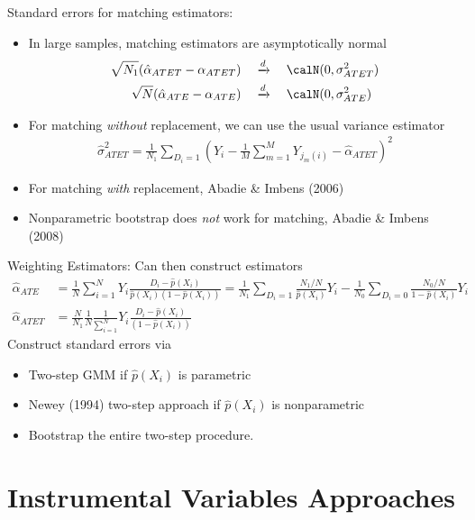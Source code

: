 \documentclass[12pt]{article}
\theoremstyle{plain}
\theoremstyle{definition}
\theoremstyle{remark}
\newcommand{\dto}{\xrightarrow{d}}
\newcommand{\sumiN}{\sum^N_{i=1}}
\begin{document}
\clearpage
Standard errors for matching estimators:
\begin{itemize}
  \item In large samples, matching estimators are asymptotically
    normal
    \begin{align*}
      \sqrt{N_1}(\hat{\alpha}_{ATET}-\alpha_{ATET})
      \quad&\dto\quad
      \calN(0,\sigma^2_{ATET})
      \\
      \sqrt{N}(\hat{\alpha}_{ATE}-\alpha_{ATE})
      \quad&\dto\quad
      \calN(0,\sigma^2_{ATE})
    \end{align*}
  \item For matching \emph{without} replacement, we can use the
    usual variance estimator
    \begin{align*}
      \hat{\sigma}^2_{ATET}
      =
      \frac{1}{N_1}
      \sum_{D_i=1}
      \left(
      Y_i
      -
      \frac{1}{M}
      \sum_{m=1}^M
      Y_{j_m(i)}
      -
      \hat{\alpha}_{ATET}
      \right)^2
    \end{align*}
  \item For matching \emph{with} replacement, Abadie \& Imbens
    (2006)

  \item Nonparametric bootstrap does \emph{not} work for matching,
    Abadie \& Imbens (2008)
\end{itemize}
Weighting Estimators:
Can then construct estimators
\begin{align*}
  \hat{\alpha}_{ATE}
  &=
  \frac{1}{N}
  \sumiN
  Y_i
  \frac{D_i-\hat{p}(X_i)}{\hat{p}(X_i)(1-\hat{p}(X_i))}
  =
  \frac{1}{N_1}
  \sum_{D_i=1}
  \frac{N_1/N}{\hat{p}(X_i)}
  Y_i
  -
  \frac{1}{N_0}
  \sum_{D_i=0}
  \frac{N_0/N}{1-\hat{p}(X_i)}
  Y_i
  \\
  \hat{\alpha}_{ATET}
  &=
  \frac{N}{N_1}
  \frac{1}{N}
  \frac{1}{\sumiN}
  Y_i
  \frac{D_i-\hat{p}(X_i)}{(1-\hat{p}(X_i))}
\end{align*}
Construct standard errors via
\begin{itemize}
  \item Two-step GMM if $\hat{p}(X_i)$ is parametric
  \item Newey (1994) two-step approach if $\hat{p}(X_i)$ is
    nonparametric
  \item Bootstrap the entire two-step procedure.
\end{itemize}




\clearpage
\section{Instrumental Variables Approaches}
\end{document}
